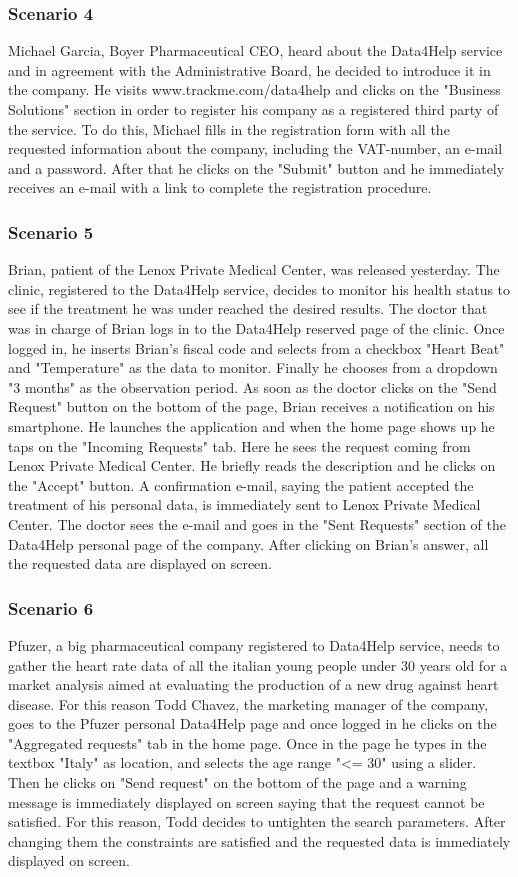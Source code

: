 \subsubsection{Scenario 4}
Michael Garcia, Boyer Pharmaceutical CEO, heard about the Data4Help service and in agreement with the Administrative Board, he decided to introduce it in the company. He visits  www.trackme.com/data4help and clicks on the "Business Solutions" section in order to register his company as a registered third party of the service. To do this, Michael fills in the registration form with all the requested information about the company, including the VAT-number, an e-mail and a password. After that he clicks on the "Submit" button and he immediately receives an e-mail with a link to complete the registration procedure.
\subsubsection{Scenario 5}
Brian, patient of the Lenox Private Medical Center, was released  yesterday. The clinic, registered to the Data4Help service, decides to monitor his health status to see if the treatment he was under reached the desired results.
The doctor that was in charge of Brian logs in to the Data4Help reserved page of the clinic. Once logged in, he inserts Brian's fiscal code and selects from a checkbox "Heart Beat" and "Temperature" as the data to monitor. Finally he chooses from a dropdown "3 months" as the observation period.
As soon as the doctor clicks on the "Send Request" button on the bottom of the page, Brian receives a notification on his smartphone. He launches the application and when the home page shows up he taps on the "Incoming Requests" tab. Here he sees the request coming from Lenox Private Medical Center. He briefly reads the description and he clicks on the "Accept" button. A confirmation e-mail, saying the patient accepted the treatment of his personal data, is immediately sent to Lenox Private Medical Center.
The doctor sees the e-mail and goes in the "Sent Requests" section of the Data4Help personal page of the company. After clicking on Brian's answer, all the requested data are displayed on screen.
\subsubsection{Scenario 6}
Pfuzer, a big pharmaceutical company registered to Data4Help service, needs to gather the heart rate data of all the italian young people under 30 years old for a market analysis aimed at evaluating the production of a new drug against heart disease. For this reason Todd Chavez, the marketing manager of the company, goes to the Pfuzer personal Data4Help page and once logged  in he clicks on the "Aggregated requests" tab in the home page. Once in the page he types in the textbox "Italy" as location, and selects the age range "<= 30" using a slider. Then he clicks on "Send request" on the bottom of the page and a warning message is immediately displayed on screen saying that the request cannot be satisfied. For this reason, Todd decides to untighten the search parameters. After changing them the constraints are satisfied and the requested data is immediately displayed on screen.
